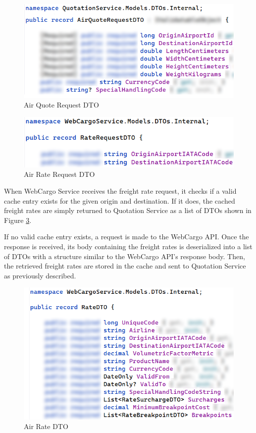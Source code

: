 \documentclass[12pt, reqno, oneside]{amsbook}
\theoremstyle{definition}
\theoremstyle{definition}
\numberwithin{section}{chapter}
\numberwithin{table}{chapter}
\numberwithin{figure}{chapter}
\begin{document}
\begin{figure}[H]
  \centering
  \includegraphics[width=0.9\linewidth]{images/AirQuoteRequestDTO.png}
  \caption{\label{Figure:AirQuoteRequestDTO}Air Quote Request DTO}
\end{figure}

\begin{figure}[H]
  \centering
  \includegraphics[width=0.9\linewidth]{images/AirRateRequestDTO.png}
  \caption{\label{Figure:AirRateRequestDTO}Air Rate Request DTO}
\end{figure}

When WebCargo Service receives the freight rate request, it checks if a valid cache entry exists for the given origin and destination. If it does, the cached freight rates are simply returned to Quotation Service as a list of \acp{DTO} shown in Figure \ref{Figure:AirRateDTO}.

If no valid cache entry exists, a request is made to the WebCargo \ac{API}. Once the response is received, its body containing the freight rates is deserialized into a list of \acp{DTO} with a structure similar to the WebCargo \ac{API}'s response body. Then, the retrieved freight rates are stored in the cache and sent to Quotation Service as previously described.

\begin{figure}[H]
  \centering
  \includegraphics[width=0.9\linewidth]{images/AirRateDTO.png}
  \caption{\label{Figure:AirRateDTO}Air Rate DTO}
\end{figure}
\end{document}
